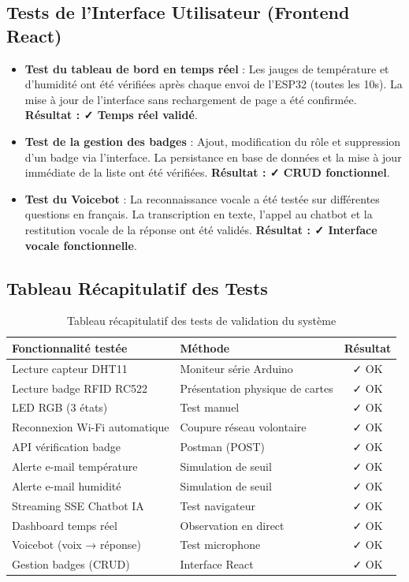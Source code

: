 \documentclass[12pt,a4paper]{report}
\begin{document}
\subsection{Tests de l'Interface Utilisateur (Frontend React)}
\begin{itemize}
    \item \textbf{Test du tableau de bord en temps réel} : Les jauges de température et d'humidité ont été vérifiées après chaque envoi de l'ESP32 (toutes les 10s). La mise à jour de l'interface sans rechargement de page a été confirmée. \textbf{Résultat : ✓ Temps réel validé}.
    \item \textbf{Test de la gestion des badges} : Ajout, modification du rôle et suppression d'un badge via l'interface. La persistance en base de données et la mise à jour immédiate de la liste ont été vérifiées. \textbf{Résultat : ✓ CRUD fonctionnel}.
    \item \textbf{Test du Voicebot} : La reconnaissance vocale a été testée sur différentes questions en français. La transcription en texte, l'appel au chatbot et la restitution vocale de la réponse ont été validés. \textbf{Résultat : ✓ Interface vocale fonctionnelle}.
\end{itemize}

\subsection{Tableau Récapitulatif des Tests}
\begin{table}[h!]
    \centering
    \begin{tabular}{|l|l|c|}
        \hline
        \textbf{Fonctionnalité testée} & \textbf{Méthode} & \textbf{Résultat} \\
        \hline
        Lecture capteur DHT11 & Moniteur série Arduino & ✓ OK \\
        Lecture badge RFID RC522 & Présentation physique de cartes & ✓ OK \\
        LED RGB (3 états) & Test manuel & ✓ OK \\
        Reconnexion Wi-Fi automatique & Coupure réseau volontaire & ✓ OK \\
        API vérification badge & Postman (POST) & ✓ OK \\
        Alerte e-mail température & Simulation de seuil & ✓ OK \\
        Alerte e-mail humidité & Simulation de seuil & ✓ OK \\
        Streaming SSE Chatbot IA & Test navigateur & ✓ OK \\
        Dashboard temps réel & Observation en direct & ✓ OK \\
        Voicebot (voix → réponse) & Test microphone & ✓ OK \\
        Gestion badges (CRUD) & Interface React & ✓ OK \\
        \hline
    \end{tabular}
    \caption{Tableau récapitulatif des tests de validation du système}
\end{table}
\end{document}
